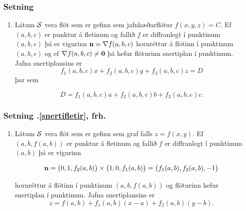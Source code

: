 \subsubsection{Setning  }
\begin {enumerate}
 \item  Látum $\cal S$ vera flöt sem er gefinn sem jafnhæðarflötur 
     $f(x,y,z)=C$.   Ef $(a, b, c)$ er punktur á fletinum og
     fallið $f$ er diffranlegt í punktinum $(a, b,c)$ þá er vigurinn
     $\mbox{${\bf n}$}=\nabla f(a, b, c)$ hornréttur á flötinn í punktinum $(a,
    b, c)$ og ef $\nabla f(a, b, c)\neq \mbox{${\bf 0}$}$ þá hefur
flöturinn snertiplan í punktinum.  Jafna
     snertiplansins er
$$f_1(a, b, c)x+f_2(a, b, c)y+f_3(a, b, c)z=D$$ 
þar sem 

$$D= f_1(a, b, c)a+f_2(a, b, c)b
+f_3(a, b, c)c.$$

\end {enumerate}



 \subsubsection{Setning \kaflanr.\ref{snertifletir}, frh.}
   \begin {enumerate}
    \item [2.] 
   Látum $\cal S$ vera flöt sem er gefinn sem graf falls 
     $z=f(x,y)$.   Ef $(a, b, f(a,b))$ er punktur á fletinum og
     fallið $f$ er diffranlegt í punktinum $(a, b)$ þá er vigurinn
     
     $$\mbox{${\bf n}$} =\big(0 ,1 ,f_2(a, b)\big)\times\big(1 ,0 ,f_1(a, b)\big)
=\big(f_1(a, b), f_2(a, b), -1\big)$$ 

hornréttur á flötinn í punktinum $(a,
     b, f(a,b))$ og flöturinn hefur snertiplan í punktinum.  Jafna
     snertiplansins er
$$z=f(a, b)+f_1(a, b)(x-a)+f_2(a, b)(y-b).$$
   \end {enumerate}

